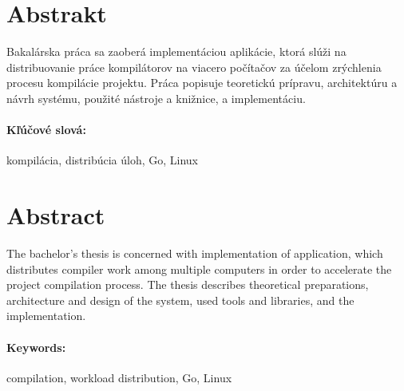\documentclass[12pt, oneside]{book}
\begin{document}

\newpage
\section*{Abstrakt}

Bakalárska práca sa zaoberá implementáciou aplikácie, ktorá slúži na distribuovanie
práce kompilátorov na viacero počítačov za účelom zrýchlenia procesu kompilácie
projektu. Práca popisuje teoretickú prípravu, architektúru a návrh systému, použité
nástroje a knižnice, a implementáciu.

\paragraph*{Kľúčové slová:} kompilácia, distribúcia úloh, Go, Linux


\newpage
\section*{Abstract}

The bachelor's thesis is concerned with implementation of application, which distributes
compiler work among multiple computers in order to accelerate the project compilation
process. The thesis describes theoretical preparations, architecture and design of the
system, used tools and libraries, and the implementation.

\paragraph*{Keywords:} compilation, workload distribution, Go, Linux




\newpage

\tableofcontents



\newpage

\listoffigures
\listoftables
\listoflistings

\end{document}
